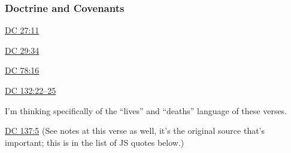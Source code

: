 	\subsubsection{Doctrine and Covenants} %
		\label{ADAMGOD-DC}
	
		
		\begin{compactdesc}
			\item[{\hyperref[DC27-11]{DC 27:11}}] 
			\item[{\hyperref[DC29-34]{DC 29:34}}] 
			\item[{\hyperref[DC78-16]{DC 78:16}}] 
			\item[{\hyperref[DC132-22]{DC 132:22--25}}]
				\begin{compactitem}
					\item I'm thinking specifically of the ``lives'' and ``deaths'' language of these verses.
				\end{compactitem}
			\item[{\hyperref[DC137-5]{DC 137:5}}] (See notes at this verse as well, it's the original source that's important; this is in the list of JS quotes below.)
		\end{compactdesc}
		
	
		
		

	
